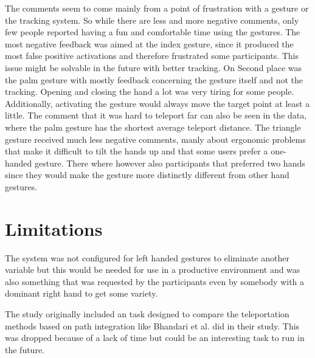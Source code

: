 The comments seem to come mainly from a point of frustration with a gesture or the tracking system. So while there are less and more negative comments, only few people reported having a fun and comfortable time using the gestures. The most negative feedback was aimed at the index gesture, since it produced the most false positive activations and therefore frustrated some participants. This issue might be solvable in the future with better tracking. On Second place was the palm gesture with mostly feedback concerning the gesture itself and not the tracking. Opening and closing the hand a lot was very tiring for some people. Additionally, activating the gesture would always move the target point at least a little. The comment that it was hard to teleport far can also be seen in the data, where the palm gesture has the shortest average teleport distance. The triangle gesture received much less negative comments, manly about ergonomic problems that make it difficult to tilt the hands up and that some users prefer a one-handed gesture. There where however also participants that preferred two hands since they would make the gesture more distinctly different from other hand gestures. 


\section{Limitations}
The system was not configured for left handed gestures to eliminate another variable but this would be needed for use in a productive environment and was also something that was requested by the participants even by somebody with a dominant right hand to get some variety. 

The study originally included an task designed to compare the teleportation methods based on path integration like Bhandari et al. \cite{Bhandari} did in their study. This was dropped because of a lack of time but could be an interesting task to run in the future.
